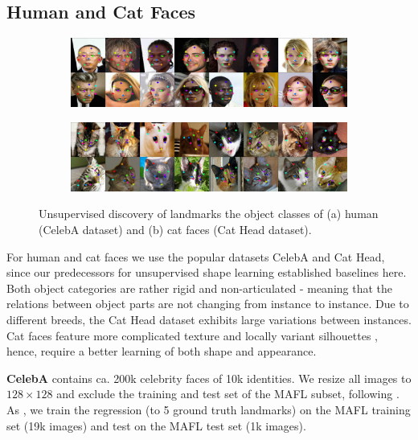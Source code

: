 	\subsection{Human and Cat Faces}\label{sec:kp_faces}
		\begin{figure}[htp]
			\centering
			\begin{subfigure}{1.\textwidth}
			\includegraphics[trim={0cm 0cm 0cm 0cm},clip, width=1.\linewidth]{fig/shape/0celeba}\caption{}
			\end{subfigure}
			\begin{subfigure}{1.\textwidth}
			\includegraphics[trim={0cm 0cm 0cm 0cm},clip, width=1.\linewidth]{fig/shape/0cats}\caption{}
			\end{subfigure}
			\caption{{Unsupervised discovery of landmarks the object classes of (a) human (CelebA dataset) and (b) cat faces (Cat Head dataset).}}
			\label{fig:kp_faces}
		\end{figure}

		For human and cat faces we use the popular datasets CelebA and Cat Head, since our predecessors for unsupervised shape learning established baselines here. Both object categories are rather rigid and non-articulated - meaning that the relations between object parts are not changing from instance to instance.
		Due to different breeds, the Cat Head dataset exhibits large variations between instances. Cat faces feature more complicated texture and locally variant silhouettes \cite{zhang08cathead}, hence, require a better learning of both shape and appearance.

			\begin{tcolorbox}
				\textbf{CelebA} \cite{liu15facewild} contains ca. 200k celebrity faces of 10k identities.
				We resize all images to $128\times 128$ and exclude the training and test set of the MAFL subset, following \cite{thewlis17}.
				As  \cite{thewlis17, zhang18}, we train the regression (to 5 ground truth landmarks) on the MAFL training set (19k images) and test on the MAFL test set (1k images).
			\end{tcolorbox}

